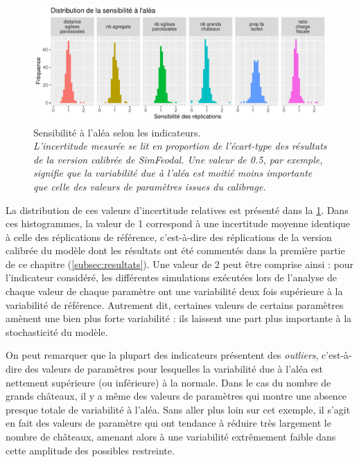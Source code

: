 \begin{figure}[H]
	\centering
	\includegraphics[width=\linewidth]{img/histo_sensibilite_alea.pdf}
	\caption[Sensibilité à l'aléa selon les indicateurs.]{Sensibilité à l'aléa selon les indicateurs.\\
	{\small
	\textit{L'incertitude mesurée se lit en proportion de l'écart-type des résultats de la version calibrée de SimFeodal.
	Une valeur de 0.5, par exemple, signifie que la variabilité due à l'aléa est moitié moins importante	que celle des valeurs de paramètres issues du calibrage.}}}
	\label{fig:histo-sensib-alea}
\end{figure}

La distribution de ces valeurs d'incertitude relatives est présenté dans la \cref{fig:histo-sensib-alea}.
Dans ces histogrammes, la valeur de 1 correspond à une incertitude moyenne identique à celle des réplications de référence, c'est-à-dire des réplications de la version calibrée du modèle dont les résultats ont été commentés dans la première partie de ce chapitre (\cref{subsec:resultats}).
Une valeur de 2 peut être comprise ainsi : pour l'indicateur considéré, les différentes simulations exécutées lors de l'analyse de chaque valeur de chaque paramètre ont une variabilité deux fois supérieure à la variabilité de référence.
Autrement dit, certaines valeurs de certains paramètres amènent une bien plus forte variabilité : ils laissent une part plus importante à la stochasticité du modèle.

On peut remarquer que la plupart des indicateurs présentent des \textit{outliers}, c'est-à-dire des valeurs de paramètres pour lesquelles la variabilité due à l'aléa est nettement supérieure (ou inférieure) à la normale.
Dans le cas du nombre de grands châteaux, il y a même des valeurs de paramètres qui montre une absence presque totale de variabilité à l'aléa.
Sans aller plus loin sur cet exemple, il s'agit en fait des valeurs de paramètre qui ont tendance à réduire très largement le nombre de châteaux, amenant alors à une variabilité extrêmement faible dans cette amplitude des possibles restreinte.

